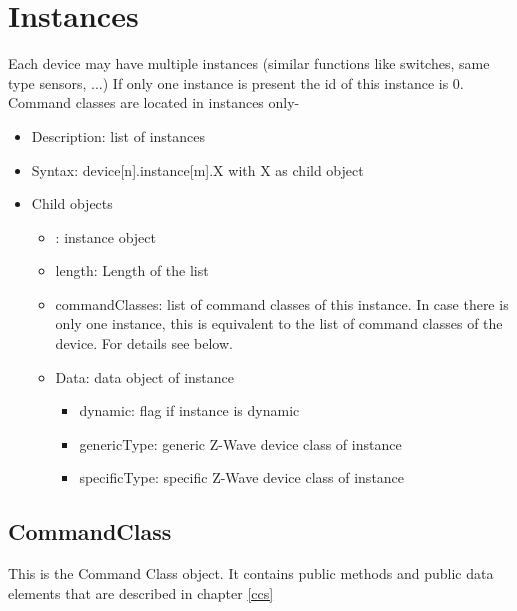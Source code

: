 \section{Instances}

Each device may have multiple instances (similar functions like switches, same type sensors, ...) If only one instance 
is present the id of this instance is 0. Command classes are located in instances only-

\begin {itemize}
\item Description: list of instances
\item Syntax:  device[n].instance[m].X with  X as child object
\item Child objects
\begin {itemize}
\item [m]: instance object
\item length: Length of the list
\item commandClasses: list of command classes of this instance. In case there is only one instance, this is equivalent to the list of command classes of the device. For details see below.
\item Data: data object of instance 
\begin {itemize}
\item dynamic: flag if instance is dynamic
\item genericType: generic Z-Wave device class of instance
\item specificType: specific Z-Wave device class of instance
\end {itemize}
\end {itemize}
\end {itemize}

\subsection{CommandClass}

This is the Command Class object. It contains public methods and public data elements that are described
in chapter \ref{ccs}


